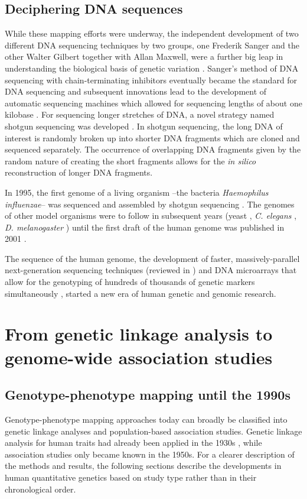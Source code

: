 \subsection{Deciphering DNA sequences}
While these mapping efforts were underway, the independent development of two different DNA sequencing techniques by two groups, one Frederik Sanger and the other Walter Gilbert together with Allan Maxwell, were a further big leap in understanding the biological basis of genetic variation \citep{Sanger1977,Maxam1977}. Sanger's method of DNA sequencing with chain-terminating inhibitors eventually became the standard for DNA sequencing and subsequent innovations lead to the development of automatic sequencing machines which allowed for sequencing lengths of about one kilobase \citep{Hunkapiller1991}. For sequencing longer stretches of DNA, a novel strategy named shotgun sequencing was developed \citep{Staden1979,Anderson1981}. In shotgun sequencing, the long DNA of interest is randomly broken up into shorter DNA fragments which are cloned and sequenced separately. The occurrence of overlapping DNA fragments given by the random nature of creating the short fragments allows for the \textit{in silico} reconstruction of longer DNA fragments.

In 1995, the first genome of a living organism --the bacteria \textit{Haemophilus influenzae}-- was sequenced and assembled by shotgun sequencing \citep{Fleischmann1995}. The genomes of other model organisms were to follow in subsequent years (yeast \citep{Goffeau1996}, \textit{C. elegans} \citep{C.elegans1998}, \textit{D. melanogaster} \citep{Adams2000}) until the first draft of the human genome was published in  2001 \citep{Lander2001}. 

The sequence of the human genome, the development of faster, massively-parallel next-generation sequencing techniques (reviewed in \citep{Shendure2008,Heather2016}) and DNA microarrays that allow for the genotyping of hundreds of thousands of genetic markers simultaneously \citep{Wang1998}, started a new era of human genetic and genomic research. 

\section{From genetic linkage analysis to genome-wide association studies}
\subsection{Genotype-phenotype mapping until the 1990s}
Genotype-phenotype mapping approaches today can broadly be classified into genetic linkage analyses and population-based association studies. Genetic linkage analysis for human traits had already been applied in the 1930s \citep{Bernstein1930,Penrose1935}, while association studies only became known in the 1950s. For a clearer description of the methods and results, the following sections describe the developments in human quantitative genetics based on study type rather than in their chronological order. 

